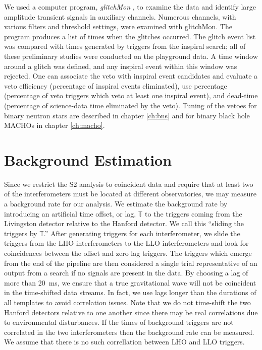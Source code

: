 We used a computer program, {\it glitchMon} \cite{glitchMon}, to examine the
data and identify large amplitude transient signals in auxiliary channels.
Numerous channels, with various filters and threshold settings, were examined
with glitchMon. The program produces a list of times when the glitches
occurred. The glitch event list was compared with times generated by triggers
from the inspiral search; all of these preliminary studies were conducted on
the playground data.  A time window around a glitch was defined, and any
inspiral event within this window was rejected. One can associate the veto
with inspiral event candidates and evaluate a veto efficiency (percentage of
inspiral events eliminated), use percentage (percentage of veto triggers which
veto at least one inspiral event), and dead-time (percentage of science-data
time eliminated by the veto). Tuning of the vetoes for binary neutron stars
are described in chapter \ref{ch:bns} and for binary black hole MACHOs in
chapter \ref{ch:macho}.

\section{Background Estimation}
\label{s:background}

Since we restrict the S2 analysis to coincident data and require that at least
two of the interferometers must be located at different observatories, we may
measure a background rate for our analysis.  We estimate the background rate
by introducing an artificial time offset, or {lag}, $\mathbb{T}$ to the
triggers coming from the Livingston detector relative to the Hanford detector.
We call this ``sliding the triggers by $\mathbb{T}$.'' After generating
triggers for each interferometer, we slide the triggers from the LHO
interferometers to the LLO interferometers and look for coincidences between
the offset and zero lag triggers.  The triggers which emerge from the end of
the pipeline are then considered a single trial representative of an output
from a search if no signals are present in the data.   By choosing a lag of
more than 20~ms, we ensure that a true gravitational wave will not be
coincident in the time-shifted data streams.  In fact, we use lags longer than
the durations of all templates to avoid correlation issues.  Note that we do
not time-shift the two Hanford detectors relative to one another since there
may be real correlations due to environmental disturbances.  If the times of
background triggers are not correlated in the two interferometers then the
background rate can be measured. We assume that there is no such correllation
between LHO and LLO triggers.

